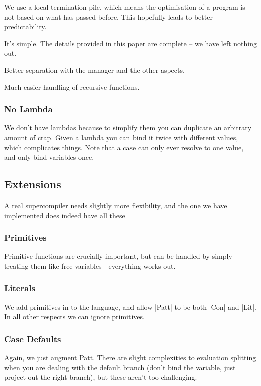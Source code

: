 \documentclass[draft]{sigplanconf}
\begin{document}
\begin{code}
We use a local termination pile, which means the optimisation of a program is not based on what has passed before. This hopefully leads to better predictability.

It's simple. The details provided in this paper are complete -- we have left nothing out.

Better separation with the manager and the other aspects.

Much easier handling of recursive functions.

\subsubsection{No Lambda}
\label{sec:nolambda}

We don't have lambdas because to simplify them you can duplicate an arbitrary amount of crap. Given a lambda you can bind it twice with different values, which complicates things. Note that a case can only ever resolve to one value, and only bind variables once.

\subsection{Extensions}
\label{sec:extensions}

A real supercompiler needs slightly more flexibility, and the one we have implemented does indeed have all these

\subsubsection{Primitives}

Primitive functions are crucially important, but can be handled by simply treating them like free variables - everything works out.

\subsubsection{Literals}

We add primitives in to the language, and allow |Patt| to be both |Con| and |Lit|. In all other respects we can ignore primitives.

\subsubsection{Case Defaults}

Again, we just augment Patt. There are slight complexities to evaluation splitting when you are dealing with the default branch (don't bind the variable, just project out the right branch), but these aren't too challenging.


\end{code}
\end{document}
